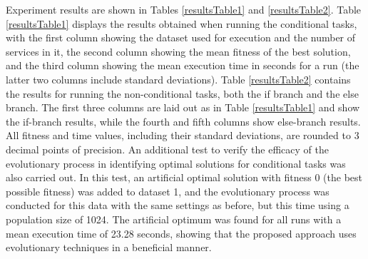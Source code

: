 \documentclass[conference]{IEEEtran}
\begin{document}
Experiment results are shown in Tables \ref{resultsTable1} and \ref{resultsTable2}. Table \ref{resultsTable1} displays the results obtained when running the conditional tasks, with the first column showing the dataset used for execution and the number of services in it, the second column showing the mean fitness of the best solution, and the third column showing the mean execution time in seconds for a run (the latter two columns include standard deviations). Table \ref{resultsTable2} contains the results for running the non-conditional tasks, both the if branch and the else branch. The first three columns are laid out as in Table \ref{resultsTable1} and show the if-branch results, while the fourth and fifth columns show else-branch results. All fitness and time values, including their standard deviations, are rounded to 3 decimal points of precision. An additional test to verify the efficacy of the evolutionary process in identifying optimal solutions for conditional tasks was also carried out. In this test, an artificial optimal solution with fitness 0 (the best possible fitness) was added to dataset 1, and the evolutionary process was conducted for this data with the same settings as before, but this time using a population size of 1024. The artificial optimum was found for all runs with a mean execution time of 23.28 seconds, showing that the proposed approach uses evolutionary techniques in a beneficial manner.
\end{document}
